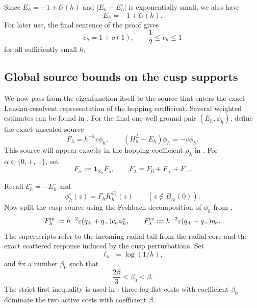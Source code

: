 \documentclass[11pt]{article}
\newcommand{\eps}{\varepsilon}
\newcommand{\cE}{\mathcal E}
\newcommand{\cO}{\mathcal O}
\begin{document}
Since $E_h^\circ=-1+\cO(h)$ and $|E_h-E_h^\circ|$ is exponentially small, we also have
\begin{equation}\label{eq:final-energy-scale}
 E_h=-1+\cO(h).
\end{equation}
For later use, the final sentence of the proof gives
\begin{equation}\label{eq:ch-lower}
 c_h=1+o(1),
 \qquad \frac12\le c_h\le1
\end{equation}
for all sufficiently small $h$.

\subsection{Global source bounds on the cusp supports}\label{sec:global-source}
We now pass from the eigenfunction itself to the source that enters the exact Landau-resolvent representation of the hopping coefficient. Several weighted estimates can be found in . For the final one-well ground pair $(E_h,\phi_h)$, define the exact unscaled source
\begin{equation}\label{eq:source-exact-master}
 F_\lambda=h^{-2}v\phi_h,
 \qquad
 (H_h^L-E_h)\phi_h=-v\phi_h.
\end{equation}
This source will appear exactly in the hopping coefficient $\rho_\lambda$ in . For $\alpha\in\{0,+,-\}$, set
\[
 F_\alpha:=\mathbf 1_{S_\alpha}F_\lambda,
 \qquad
 F_\lambda=F_0+F_++F_-.
\]

Recall $\cE_h^\circ=-E_h^\circ$ and
\begin{equation}\label{eq:radial-tail-again}
 \phi_h^\circ(z)=\Gamma_hK_h^{\cE_h^\circ}(z)
 \qquad (z\notin B_{r_0}(0)).
\end{equation}
Now split the cusp source using the Feshbach decomposition of $\phi_h$ from ,
\begin{equation}\label{eq:source-split}
 F_\lambda^{\rm in}
 :=h^{-2}\eps(q_++q_-)c_h\phi_h^\circ,
 \qquad
 F_\lambda^{\rm sc}
 :=h^{-2}\eps(q_++q_-)\eta_h.
\end{equation}
The superscripts refer to the incoming radial tail from the radial core and the exact scattered
response induced by the cusp perturbations.  Set
\begin{equation}\label{eq:ell-h}
 \ell_h:=\log(1/h),
\end{equation}
and fix a number $\beta_0$ such that
\begin{equation}\label{eq:beta0-choice}
 \frac{2\beta}{3}<\beta_0<\beta.
\end{equation}
The strict first inequality is used in :
three log-flat costs with coefficient $\beta_0$ dominate the two active costs
with coefficient $\beta$.
\end{document}
